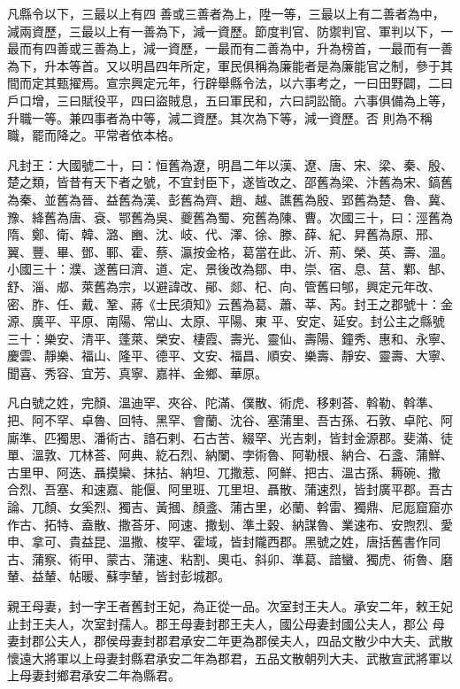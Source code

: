 \begin{pinyinscope}
 凡縣令以下，三最以上有四
 善或三善者為上，陞一等，三最以上有二善者為中，減兩資歷，三最以上有一善為下，減一資歷。節度判官、防禦判官、軍判以下，一最而有四善或三善為上，減一資歷，一最而有二善為中，升為榜首，一最而有一善為下，升本等首。又以明昌四年所定，軍民俱稱為廉能者是為廉能官之制，參于其間而定其甄擢焉。宣宗興定元年，行辟舉縣令法，以六事考之，一曰田野闢，二曰戶口增，三曰賦役平，四曰盜賊息，五曰軍民和，六曰詞訟簡。六事俱備為上等，升職一等。兼四事者為中等，減二資歷。其次為下等，減一資歷。否
 則為不稱職，罷而降之。平常者依本格。



 凡封王：大國號二十，曰：恒舊為遼，明昌二年以漢、遼、唐、宋、梁、秦、殷、楚之類，皆昔有天下者之號，不宜封臣下，遂皆改之、邵舊為梁、汴舊為宋、鎬舊為秦、並舊為晉、益舊為漢、彭舊為齊、趙、越、譙舊為殷、郢舊為楚、魯、冀、豫、絳舊為唐、袞、鄂舊為吳、夔舊為蜀、宛舊為陳、曹。次國三十，曰：涇舊為隋、鄭、衛、韓、潞、豳、沈、岐、代、澤、徐、滕、薛、紀、昇舊為原、邢、翼、豐、畢、鄧、鄆、霍、蔡、瀛按金格，葛當在此、沂、荊、榮、英、壽、溫。小國三十：濮、遂舊曰濟、道、定、景後改為鄒、申、崇、宿、息、莒、鄴、郜、舒、淄、郕、萊舊為宗，以避諱改、鄖、郯、杞、向、管舊曰郇，興定元年改、密、胙、任、戴、鞏、蔣《士民須知》云舊為葛、蕭、莘、芮。封王之郡號十：金源、廣平、平原、南陽、常山、太原、平陽、東
 平、安定、延安。封公主之縣號三十：樂安、清平、蓬萊、榮安、棲霞、壽光、靈仙、壽陽、鐘秀、惠和、永寧、慶雲、靜樂、福山、隆平、德平、文安、福昌、順安、樂壽、靜安、靈壽、大寧、聞喜、秀容、宜芳、真寧、嘉祥、金鄉、華原。



 凡白號之姓，完顏、溫迪罕、夾谷、陀滿、僕散、術虎、移剌荅、斡勒、斡準、把、阿不罕、卓魯、回特、黑罕、會蘭、沈谷、塞蒲里、吾古孫、石敦、卓陀、阿廝準、匹獨思、潘術古、諳石剌、石古苦、綴罕、光吉剌，皆封金源郡。斐滿、徒單、溫敦、兀林荅、阿典、紇石烈、納闌、孛術魯、阿勒根、納合、石盞、蒲鮮、古里甲、阿迭、聶摸欒、抹拈、納坦、兀撒惹、阿鮮、把古、溫古孫、耨碗、撒
 合烈、吾塞、和速嘉、能偃、阿里班、兀里坦、聶散、蒲速烈，皆封廣平郡。吾古論、兀顏、女奚烈、獨吉、黃摑、顏盞、蒲古里，必蘭、斡雷、獨鼎、尼厖窟窟亦作古、拓特、盍散、撒荅牙、阿速、撒刬、準土穀、納謀魯、業速布、安煦烈、愛申、拿可、貴益昆、溫撒、梭罕、霍域，皆封隴西郡。黑號之姓，唐括舊書作同古、蒲察、術甲、蒙古、蒲速、粘割、奧屯、斜卯、準葛、諳蠻、獨虎、術魯、磨輦、益輦、帖暖、蘇孛輦，皆封彭城郡。



 親王母妻，封一字王者舊封王妃，為正從一品。次室封王夫人。承安二年，敕王妃止封王夫人，次室封孺人。郡王母妻封郡王夫人，國公母妻封國公夫人，郡公
 母妻封郡公夫人，郡侯母妻封郡君承安二年更為郡侯夫人，四品文散少中大夫、武散懷遠大將軍以上母妻封縣君承安二年為郡君，五品文散朝列大夫、武散宣武將軍以上母妻封鄉君承安二年為縣君。




\end{pinyinscope}
